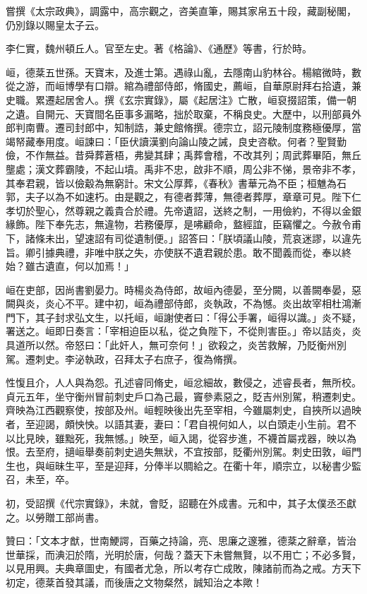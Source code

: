\begin{pinyinscope}
 嘗撰《太宗政典》，調露中，高宗觀之，咨美直筆，賜其家帛五十段，藏副秘閣，仍別錄以賜皇太子云。



 李仁實，魏州頓丘人。官至左史。著《格論》、《通歷》等書，行於時。



 峘，德棻五世孫。天寶末，及進士第。遇祿山亂，去隱南山豹林谷。楊綰微時，數從之游，而峘博學有口辯。綰為禮部侍郎，脩國史，薦峘，自華原尉拜右拾遺，兼史職。累遷起居舍人。撰《玄宗實錄》，屬《起居注》亡散，峘裒掇詔策，備一朝之遺。自開元、天寶間名臣事多漏略，拙於取棄，不稱良史。大歷中，以刑部員外郎判南曹。遷司封郎中，知制誥，兼史館脩撰。德宗立，詔元陵制度務極優厚，當竭帑藏奉用度。峘諫曰：「臣伏讀漢劉向論山陵之誡，良史咨欷。何者？聖賢勤儉，不作無益。昔舜葬蒼梧，弗變其肆；禹葬會稽，不改其列；周武葬畢陌，無丘壟處；漢文葬霸陵，不起山墳。禹非不忠，啟非不順，周公非不悌，景帝非不孝，其奉君親，皆以儉觳為無窮計。宋文公厚葬，《春秋》書華元為不臣；桓魋為石郭，夫子以為不如速朽。由是觀之，有德者葬薄，無德者葬厚，章章可見。陛下仁孝切於聖心，然尊親之義貴合於禮。先帝遺詔，送終之制，一用儉約，不得以金銀緣飾。陛下奉先志，無違物，若務優厚，是咈顧命，盩經誼，臣竊懼之。今赦令甫下，諸條未出，望速詔有司從遺制便。」詔答曰：「朕頃議山陵，荒哀迷謬，以違先旨。卿引據典禮，非唯中朕之失，亦使朕不遺君親於患。敢不聞義而從，奉以終始？雖古遺直，何以加焉！」



 峘在吏部，因尚書劉晏力。時楊炎為侍郎，故峘內德晏，至分闕，以善闕奉晏，惡闕與炎，炎心不平。建中初，峘為禮部侍郎，炎執政，不為憾。炎出故宰相杜鴻漸門下，其子封求弘文生，以托峘，峘謝使者曰：「得公手署，峘得以識。」炎不疑，署送之。峘即日奏言：「宰相迫臣以私，從之負陛下，不從則害臣。」帝以詰炎，炎具道所以然。帝怒曰：「此奸人，無可奈何！」欲殺之，炎苦救解，乃貶衡州別駕。遷刺史。李泌執政，召拜太子右庶子，復為脩撰。



 性愎且介，人人與為怨。孔述睿同脩史，峘忿細故，數侵之，述睿長者，無所校。貞元五年，坐守衡州冒前刺史戶口為己最，竇參素惡之，貶吉州別駕，稍遷刺史。齊映為江西觀察使，按部及州。峘輕映後出先至宰相，今雖屬刺史，自挾所以過映者，至迎謁，頗怏怏。以語其妻，妻曰：「君自視何如人，以白頭走小生前。君不以比見映，雖黜死，我無憾。」映至，峘入謁，從容步進，不襪首屬戎器，映以為恨。去至府，擿峘舉奏前刺史過失無狀，不宜按部，貶衢州別駕。刺史田敦，峘門生也，與峘昧生平，至是迎拜，分俸半以賙給之。在衢十年，順宗立，以秘書少監召，未至，卒。



 初，受詔撰《代宗實錄》，未就，會貶，詔聽在外成書。元和中，其子太僕丞丕獻之。以勞贈工部尚書。



 贊曰：「文本才猷，世南鯁諤，百藥之持論，亮、思廉之邃雅，德棻之辭章，皆治世華採，而淟汩於隋，光明於唐，何哉？蓋天下未嘗無賢，以不用亡；不必多賢，以見用興。夫典章圖史，有國者尤急，所以考存亡成敗，陳諸前而為之戒。方天下初定，德棻首發其議，而後唐之文物粲然，誠知治之本歟！



\end{pinyinscope}
